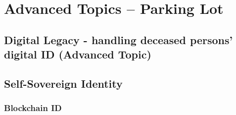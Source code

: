 \hypertarget{section}{%
\section{}\label{section}}

\hypertarget{advanced-topics-parking-lot}{%
\chapter{Advanced Topics -- Parking
Lot}\label{advanced-topics-parking-lot}}

\hypertarget{digital-legacy---handling-deceased-persons-digital-id-advanced-topic}{%
\section{Digital Legacy - handling deceased persons' digital ID
(Advanced
Topic)}\label{digital-legacy---handling-deceased-persons-digital-id-advanced-topic}}

\hypertarget{self-sovereign-identity}{%
\section{Self-Sovereign Identity}\label{self-sovereign-identity}}

\hypertarget{blockchain-id}{%
\subsection{Blockchain ID}\label{blockchain-id}}
